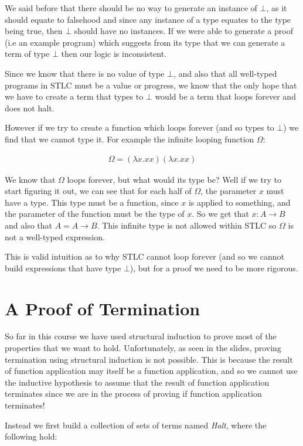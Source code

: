 \documentclass{article}
\newcommand{\inlineeq}[1]{
    \vspace{-2em}
    \begin{gather*}
    #1
    \end{gather*}
    \vspace{-2em}
}
\begin{document}
We said before that there should be no way to generate an instance of $\bot$, as it should equate to falsehood and since any instance of a type equates to the type being true, then $\bot$ should have no instances. If we were able to generate a proof (i.e an example program) which suggests from its type that we can generate a term of type $\bot$ then our logic is inconsistent.

Since we know that there is no value of type $\bot$, and also that all well-typed programs in STLC must be a value or progress, we know that the only hope that we have to create a term that types to $\bot$ would be a term that loops forever and does not halt.

However if we try to create a function which loops forever (and so types to $\bot$) we find that we cannot type it. For example the infinite looping function $\Omega$:

\inlineeq{
\Omega = (\lambda x. x x)(\lambda x. x x)
}

We know that $\Omega$ loops forever, but what would its type be? Well if we try to start figuring it out, we can see that for each half of $\Omega$, the parameter $x$ must have a type. This type must be a function, since $x$ is applied to something, and the parameter of the function must be the type of $x$. So we get that $x: A\to B$ and also that $A=A \to B$. This infinite type is not allowed within STLC so $\Omega$ is not a well-typed expression.

This is valid intuition as to why STLC cannot loop forever (and so we cannot build expressions that have type $\bot$), but for a proof we need to be more rigorous.

\newpage
\section{A Proof of Termination}

So far in this course we have used structural induction to prove most of the properties that we want to hold. Unfortunately, as seen in the slides, proving termination using structural induction is not possible. This is because the result of function application may itself be a function application, and so we cannot use the inductive hypothesis to assume that the result of function application terminates since we are in the process of proving if function application terminates!

Instead we first build a collection of sets of terms named \textit{Halt}, where the following hold:
\end{document}
